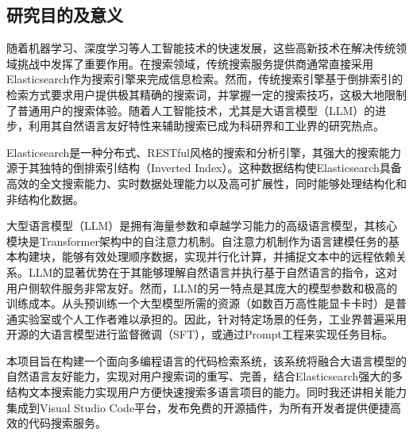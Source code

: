\documentclass[UTF8,a4paper,12pt]{ctexart}
\numberwithin{equation}{section}
\begin{document}
\subsection{研究目的及意义}
随着机器学习、深度学习等人工智能技术的快速发展，这些高新技术在解决传统领域挑战中发挥了重要作用。在搜索领域，传统搜索服务提供商通常直接采用Elasticsearch作为搜索引擎来完成信息检索。然而，传统搜索引擎基于倒排索引的检索方式要求用户提供极其精确的搜索词，并掌握一定的搜索技巧，这极大地限制了普通用户的搜索体验。随着人工智能技术，尤其是大语言模型（LLM）的进步，利用其自然语言友好特性来辅助搜索已成为科研界和工业界的研究热点。\par
Elasticsearch是一种分布式、RESTful风格的搜索和分析引擎，其强大的搜索能力源于其独特的倒排索引结构（Inverted Index）。这种数据结构使Elasticsearch具备高效的全文搜索能力、实时数据处理能力以及高可扩展性，同时能够处理结构化和非结构化数据。\par
大型语言模型（LLM）是拥有海量参数和卓越学习能力的高级语言模型，其核心模块是Transformer架构中的自注意力机制。自注意力机制作为语言建模任务的基本构建块，能够有效处理顺序数据，实现并行化计算，并捕捉文本中的远程依赖关系。LLM的显著优势在于其能够理解自然语言并执行基于自然语言的指令，这对用户侧软件服务非常友好。然而，LLM的另一特点是其庞大的模型参数和极高的训练成本。从头预训练一个大型模型所需的资源（如数百万高性能显卡卡时）是普通实验室或个人工作者难以承担的。因此，针对特定场景的任务，工业界普遍采用开源的大语言模型进行监督微调（SFT），或通过Prompt工程来实现任务目标。\par
本项目旨在构建一个面向多编程语言的代码检索系统，该系统将融合大语言模型的自然语言友好能力，实现对用户搜索词的重写、完善，结合Elasticsearch强大的多结构文本搜索能力实现用户方便快速搜索多语言项目的能力。同时我还讲相关能力集成到Visual Studio Code平台，发布免费的开源插件，为所有开发者提供便捷高效的代码搜索服务。
\end{document}
